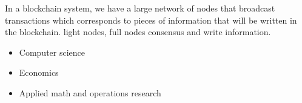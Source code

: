 In a blockchain system, we have a large network of nodes that broadcast transactions which corresponds to pieces of information that will be written in the blockchain. light nodes, full nodes consensus and write information. 


\begin{itemize}
	\item Computer science
	\item Economics
	\item Applied math and operations research
\end{itemize}
\newpage